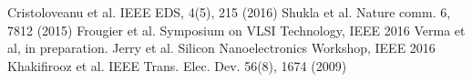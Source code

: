 \setlength{\multicolsep}{0em}
\begin{multicols}{2}
{\fontsize{9pt}{9pt}\selectfont

\frenchspacing

\renewcommand{\section}[2]{}
\begin{thebibliography}{9} 

Cristoloveanu et al.  IEEE EDS, 4(5), 215 (2016)
Shukla et al. Nature comm. 6, 7812 (2015)
Frougier et al. Symposium on VLSI Technology, IEEE 2016
Verma et al, in preparation.
Jerry et al. Silicon Nanoelectronics Workshop, IEEE 2016
Khakifirooz et al.  IEEE Trans. Elec. Dev. 56(8), 1674 (2009)

\end{thebibliography}
}
\end{multicols}

\pagebreak

